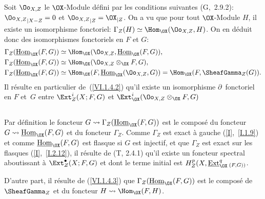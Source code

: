 \subsection{} \label{VI.1.4}
Soit $\Oo_{X, Z}$ le $\OX$-Module d\'efini par les conditions suivantes (G,~2.9.2): ${\Oo_{X, Z}}_{|X{-} Z}=0$ et ${\Oo_{X, Z}}_{|Z}={\OX}_{|Z}$. On a vu que pour tout $\OX$-Module $H$, il existe un isomorphisme fonctoriel: $\Gamma_Z(H)\simeq \Hom_{\OX}(\Oo_{X, Z}, H)$. On en d\'eduit donc des isomorphismes fonctoriels en $F$ et $G$: \setcounter{equation}{0}
\begin{align}
\label{VI.1.4.1}
\Gamma_Z(\mathop{\underline{\mathrm{Hom}}}\nolimits_{\OX}(F, G)) &\simeq \Hom_{\OX}(\Oo_{X, Z}, \mathop{\underline{\mathrm{Hom}}}\nolimits_{\OX}(F, G)),\\
\label{VI.1.4.2} \Gamma_Z(\mathop{\underline{\mathrm{Hom}}}\nolimits_{\OX}(F, G)) &\simeq \Hom_{\OX}(\Oo_{X, Z}\otimes_{\OX} F, G),\\
\label{VI.1.4.3} \Gamma_Z(\mathop{\underline{\mathrm{Hom}}}\nolimits_{\OX}(F, G)) &\simeq \Hom_{\OX}(F, \mathop{\underline{\mathrm{Hom}}}\nolimits_{\OX}(\Oo_{X, Z}, G))=\Hom_{\OX}(F, \SheafGamma_Z(G)).
\end{align}
Il r\'esulte en particulier de~(\ref{VI.1.4.2}) qu'il existe un isomorphisme $\partial$~fonctoriel en $F$ et~$G$ entre $\Ext_{Z}^i(X;F, G)$ et $\Ext_{{\OX}}^i(\Oo_{X, Z}\otimes_{\OX} F, G)$

\subsection{} \label{VI.1.5}
Par d\'efinition le foncteur $G \rightsquigarrow \Gamma_Z(\mathop{\underline{\mathrm{Hom}}}\nolimits_{\OX}(F, G))$ est le compos\'e du foncteur $G \rightsquigarrow\mathop{\underline{\mathrm{Hom}}}\nolimits_{\OX}(F, G)$ et du foncteur $\Gamma_Z$. Comme $\Gamma_Z$ est exact \`a gauche (\ref{I},~\ref{I.1.9}) et comme $\mathop{\underline{\mathrm{Hom}}}\nolimits_{\OX}(F, G)$ est flasque si $G$ est injectif, et que $\Gamma_Z$ est exact sur les flasques (\ref{I},~\ref{I.2.12}), il r\'esulte de (T, 2.4.1) qu'il existe un foncteur spectral aboutissant \`a $\Ext_{Z}^\bullet(X;F, G)$ et dont le terme initial est $H_Z^p(X, \mathop{\underline{\mathrm{Ext}}}\nolimits_{\OX}^q{}_{(F, G))}$.

D'autre part, il r\'esulte de (\ref{VI.1.4.3}) que $\Gamma_Z(\mathop{\underline{\mathrm{Hom}}}\nolimits_{\OX}(F, G))$ est le compos\'e de $\SheafGamma_Z$ et du foncteur $H \rightsquigarrow \Hom_{\OX}(F, H)$.


